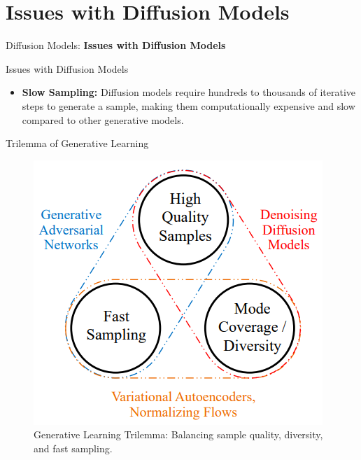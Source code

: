 \section{Issues with Diffusion Models}
\begin{frame}{}
    \LARGE Diffusion Models: \textbf{Issues with Diffusion Models}
\end{frame}


\begin{frame}{Issues with Diffusion Models}
\begin{itemize}
    \item \textbf{Slow Sampling:} Diffusion models require hundreds to thousands of iterative steps to generate a sample, making them computationally expensive and slow compared to other generative models.
\end{itemize}
\end{frame}

\begin{frame}{Trilemma of Generative Learning}
    \begin{figure}
        \centering
        \includegraphics[height=0.8\textheight, width=\textwidth, keepaspectratio]{images/diffusion/trilemma.png}
        \caption*{Generative Learning Trilemma: Balancing sample quality, diversity, and fast sampling.}
    \end{figure}
\end{frame}


